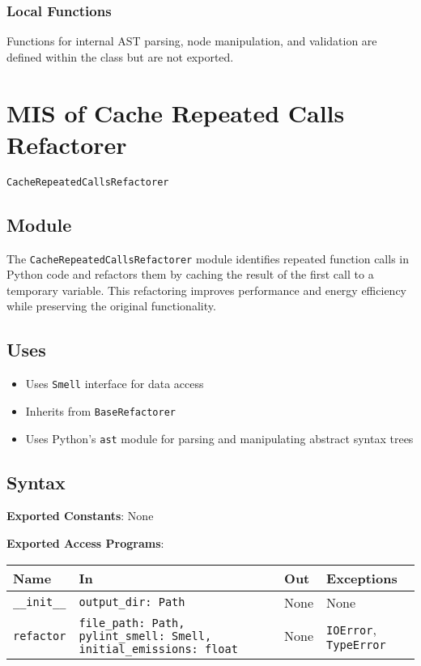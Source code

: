 \documentclass[12pt, titlepage]{article}
\begin{document}
\subsubsection{Local Functions}
Functions for internal AST parsing, node manipulation, and validation are defined within the class but are not exported.

\newpage

\section{MIS of Cache Repeated Calls Refactorer} \label{mis:CacheCalls}

\texttt{CacheRepeatedCallsRefactorer}

\subsection{Module}

The \texttt{CacheRepeatedCallsRefactorer} module identifies repeated function calls in Python code and refactors them by caching the result of the first call to a temporary variable. This refactoring improves performance and energy efficiency while preserving the original functionality.

\subsection{Uses}
\begin{itemize}
  \item Uses \texttt{Smell} interface for data access
  \item Inherits from \texttt{BaseRefactorer}
  \item Uses Python's \texttt{ast} module for parsing and manipulating abstract syntax trees
\end{itemize}

\subsection{Syntax}
\noindent
\textbf{Exported Constants}: None

\noindent
\textbf{Exported Access Programs}:\\
\begin{tabularx}{\linewidth}{|l|>{\raggedright\arraybackslash}X|l|l|}
  \toprule Name & In & Out & Exceptions \\
  \midrule
  \texttt{\_\_init\_\_} & \texttt{output\_dir: Path} & None & None \\
  \hline
  \texttt{refactor} & \texttt{file\_path: Path, pylint\_smell: Smell, initial\_emissions: float} & None & \texttt{IOError}, \texttt{TypeError} \\
  \bottomrule
\end{tabularx}
\end{document}
